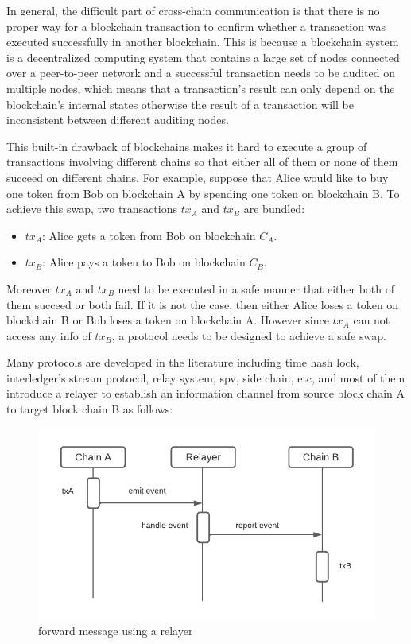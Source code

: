 \documentclass[pageno]{jpaper}
\begin{document}
In general, the difficult part of cross-chain communication is that there is no proper way for a blockchain transaction to confirm whether a transaction was executed successfully in another blockchain. This is because a blockchain system is a decentralized computing system that contains a large set of nodes connected over a peer-to-peer network and a successful transaction needs to be audited on multiple nodes, which means that a transaction's result can only depend on the blockchain's internal states otherwise the result of a transaction will be inconsistent between different auditing nodes. 

This built-in drawback of blockchains makes it hard to execute a group of transactions involving different chains so that either all of them or none of them succeed on different chains. For example, suppose that Alice would like to buy one token from Bob on blockchain A by spending one token on blockchain B. To achieve this swap, two transactions $tx_A$ and $tx_B$ are bundled:
\begin{itemize}[leftmargin=*]
\item $tx_A$: Alice gets a token from Bob on blockchain $C_A$.
\item $tx_B$: Alice pays a token to Bob on blockchain $C_B$.
\end{itemize}
Moreover $tx_A$ and $tx_B$ need to be executed in a safe manner that either both of them succeed or both fail. If it is not the case, then either Alice loses a token on blockchain B or Bob loses a token on blockchain A. However since $tx_A$ can not access any info of $tx_B$, a protocol needs to be designed to achieve a safe swap.

Many protocols are developed in the literature including time hash lock, interledger’s stream protocol, relay system, spv, side chain, etc, and most of them introduce a relayer to establish an information channel from source block chain A to target block chain B as follows:
\begin{figure}[h]
\caption{forward message using a relayer}
\label{relayer-connection}
\includegraphics[scale=0.6]{relayer}
\end{figure}
\end{document}
